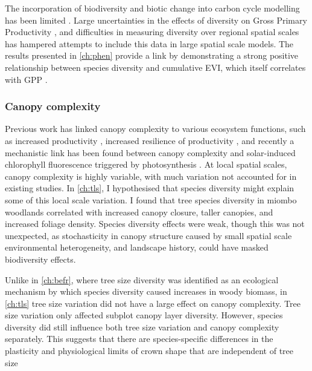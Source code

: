 \begin{refsection}
The incorporation of biodiversity and biotic change into carbon cycle modelling has been limited \citep{Ahlstrom2015, Bodegom2011}. Large uncertainties in the effects of diversity on Gross Primary Productivity \citep{}, and difficulties in measuring diversity over regional spatial scales has hampered attempts to include this data in large spatial scale models. The results presented in \autoref{ch:phen} provide a link by demonstrating a strong positive relationship between species diversity and cumulative EVI, which itself correlates with GPP \citep{Sjostrom2011}.

\subsubsection{Canopy complexity}
\label{discussion:sssec:canopy}

Previous work has linked canopy complexity to various ecosystem functions, such as increased productivity \citep{Gough2019, Hardiman2011}, increased resilience of productivity \citep{Pretzsch2014}, and recently a mechanistic link has been found between canopy complexity and solar-induced chlorophyll fluorescence triggered by photosynthesis \citep{Regaieg2021}. At local spatial scales, canopy complexity is highly variable, with much variation not accounted for in existing studies. In \autoref{ch:tls}, I hypothesised that species diversity might explain some of this local scale variation. I found that tree species diversity in miombo woodlands correlated with increased canopy closure, taller canopies, and increased foliage density. Species diversity effects were weak, though this was not unexpected, as stochasticity in canopy structure caused by small spatial scale environmental heterogeneity, and landscape history, could have masked biodiversity effects.

Unlike in \autoref{ch:befr}, where tree size diversity was identified as an ecological mechanism by which species diversity caused increases in woody biomass, in \autoref{ch:tls} tree size variation did not have a large effect on canopy complexity. Tree size variation only affected subplot canopy layer diversity. However, species diversity did still influence both tree size variation and canopy complexity separately. This suggests that there are species-specific differences in the plasticity and physiological limits of crown shape that are independent of tree size


\end{refsection}
